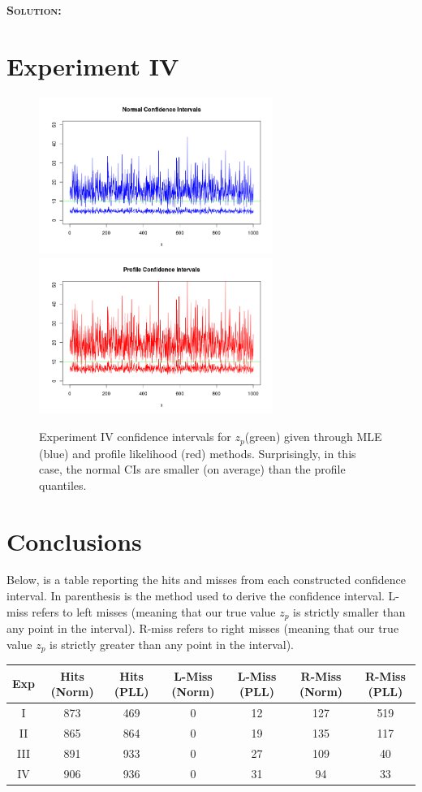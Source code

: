 \documentclass[12pt,oneside]{article}
\newenvironment{solution}
    {\textbf{\textsc{Solution:}}\\}
    {\newpage}
\begin{document}
\begin{solution}
\section*{Experiment IV}
\begin{figure}[H]
\begin{center}
{\includegraphics[width=3in]{Assignments/a2/e4-nci.png}}
{\includegraphics[width=3in]{Assignments/a2/e4-pllci.png}}
\caption{Experiment IV confidence intervals for $z_p$(green) given through MLE (blue) and profile likelihood (red) methods. Surprisingly, in this case, the normal CIs are smaller (on average) than the profile quantiles.}
\end{center}
\end{figure}


\section*{Conclusions}
Below, is a table reporting the hits and misses from each constructed confidence interval. In parenthesis is the method used to derive the confidence interval. L-miss refers to left misses (meaning that our true value $z_p$ is strictly smaller than any point in the interval). R-miss refers to right misses (meaning that our true value $z_p$ is strictly greater than any point in the interval).
\begin{center}
    \begin{tabular}{||c|c|c|c|c|c|c||}\hline
     Exp& Hits (Norm) &Hits (PLL) & L-Miss (Norm) &L-Miss (PLL)& R-Miss (Norm)& R-Miss (PLL)\\\hline
     I& 873 &469 & 0&12 &127 & 519 \\\hline
     II&   865 &864 & 0& 19& 135& 117\\\hline
     III& 891 &933 &0 &27 &109 & 40 \\\hline
     IV&  906  &936 &0 & 31&94 & 33\\\hline
\end{tabular}
\end{center}


\end{solution}
\end{document}
